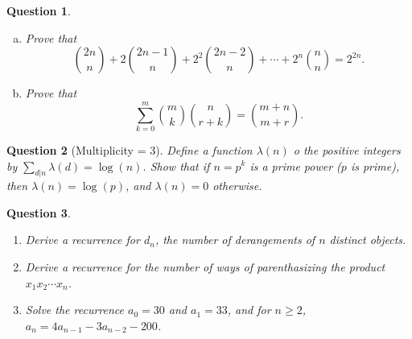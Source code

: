 \documentclass[12]{article}
\newtheorem{question}{Question}
\theoremstyle{definition}
\begin{document}
	\begin{question}
		\
		\begin{enumerate}[a)]
			\item Prove that
			$$ {2n \choose n} + 2{2n-1 \choose n} + 2^2{2n - 2 \choose n} + \cdots + 2^n{n \choose n} = 2^{2n}.$$
			\item Prove that
			$$ \sum_{k=0}^m {m \choose k} {n \choose r+k} = {m + n \choose m+r}.$$
		\end{enumerate}
	\end{question}
	
	\begin{question}[Multiplicity = 3]
		Define a function $\lambda(n)$ o the positive integers by $\sum_{d|n} \lambda(d) = \log(n)$.  Show that if $n =  p^k$ is a prime power ($p$ is prime), then $\lambda(n) = \log(p)$, and $\lambda(n) = 0$ otherwise.
	\end{question}
	
	\begin{question}
		\
		\begin{enumerate}
			\item Derive a recurrence for $d_n$, the number of derangements of $n$ distinct objects.
			\item Derive a recurrence for the number of ways of parenthasizing the product $x_1x_2\cdots x_n$.
			\item Solve the recurrence $a_0 = 30$ and $a_1 = 33$, and for $n \geq 2$, $a_n = 4a_{n-1} - 3a_{n-2}-200$.
		\end{enumerate}
	\end{question}
	
	
\end{document}
